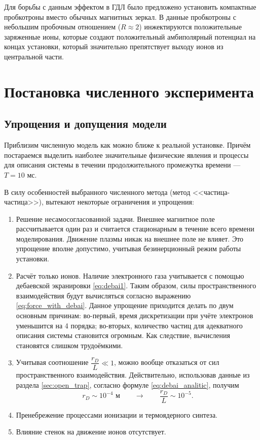 Для борьбы с данным эффектом в ГДЛ было предложено \cite{anikeev2012} установить компактные пробкотроны вместо обычных магнитных зеркал. В данные пробкотроны с небольшим пробочным отношением ($R \approx 2$) инжектируются положительные заряженные ионы, которые создают положительный амбиполярный потенциал на концах установки, который значительно препятствует выходу ионов из центральной части.

\section{Постановка численного эксперимента}

\subsection{Упрощения и допущения модели}

Приблизим численную модель как можно ближе к реальной установке. Причём постараемся выделить наиболее значительные физические явления и процессы для описания системы в течении продолжительного промежутка времени --- $T = 10 \text{ мс}$.

В силу особенностей выбранного численного метода (метод <<частица-частица>>), вытекают некоторые ограничения и упрощения:
\begin{enumerate}
	\item Решение несамосогласованной задачи. Внешнее магнитное поле рассчитывается один раз и считается стационарным в течение всего времени моделирования. Движение плазмы никак на внешнее поле не влияет. Это упрощение вполне допустимо, учитывая безинерционный режим работы установки.
	\item Расчёт только ионов. Наличие электронного газа учитывается с помощью дебаевской экранировки \eqref{eq:debai1}. Таким образом, силы пространственного взаимодействия будут вычисляться согласно выражению \eqref{eq:force_with_debai}. Данное упрощение приходится делать по двум основным причинам: во-первый, время дискретизации при учёте электронов уменьшится на 4 порядка; во-вторых, количество частиц для адекватного описания системы становится огромным. Как следствие, вычисления становятся слишком трудоёмкими.
	\item Учитывая соотношение $\dfrac{r_D}{L} \ll 1$, можно вообще отказаться от сил пространственного взаимодействия. Действительно, использовав данные из раздела \ref{sec:open_trap}, согласно формуле \eqref{eq:debai_analitic},  получим
	\begin{equation*}
		r_D \sim 10^{-4} \text{ м} \qquad \to \qquad \frac{r_D}{L} \sim 10^{-5}.
	\end{equation*}
	\item Пренебрежение процессами ионизации и термоядерного синтеза.
	\item Влияние стенок на движение ионов отсутствует.
\end{enumerate}

